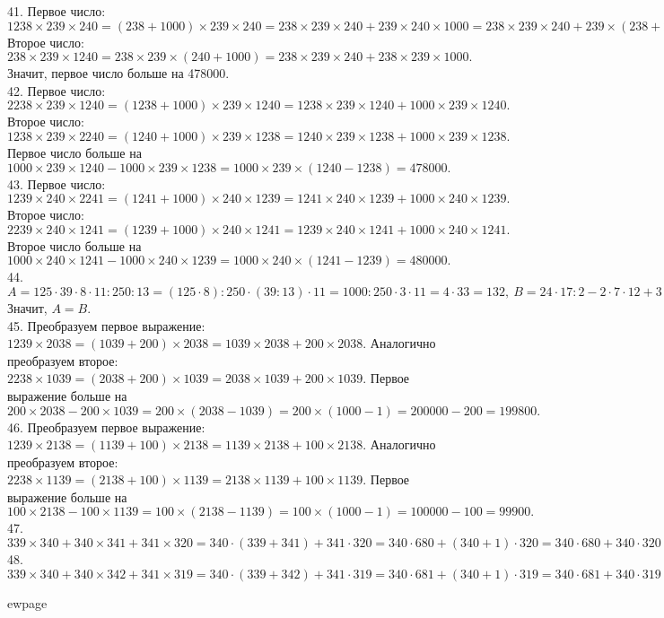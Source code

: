 41. Первое число: $1238\times239\times240=(238+1000)\times239\times240=238\times239\times240+239\times240\times1000=238\times239\times240+239\times(238+2)\times1000=
238\times239\times240+239\times238\times1000+239\times2\times1000=238\times239\times240+239\times238\times1000+478000.$ Второе число: $238\times239\times1240=238\times239\times(240+1000)=238\times239\times240+238\times239\times1000.$ Значит, первое число больше на 478000.\\
42. Первое число: $2238\times239\times1240=(1238+1000)\times239\times1240=
1238\times239\times1240+1000\times239\times1240.$ Второе число:
$1238\times239\times2240=(1240+1000)\times239\times1238=1240\times239\times1238+
1000\times239\times1238.$ Первое число больше на $1000\times239\times1240-1000\times239\times1238=1000\times239\times(1240-1238)=478000.$\\
43. Первое число: $1239\times240\times2241=(1241+1000)\times240\times1239=1241\times240\times1239+1000\times240\times1239.$ Второе число: $2239\times240\times1241=(1239+1000)\times240\times1241=
1239\times240\times1241+1000\times240\times1241.$ Второе число больше на
 $1000\times240\times1241-1000\times240\times1239=1000\times240\times(1241-1239)=480000.$\\
44. $A=125\cdot39\cdot8\cdot11:250:13=(125\cdot8):250\cdot(39:13)\cdot11=1000:250\cdot3\cdot11=4\cdot33=132,\ B=24\cdot17:2-2\cdot7\cdot12+3\cdot45\cdot4-(5+7)\cdot37=17\cdot12-14\cdot12+45\cdot12-37\cdot12=12\cdot(17-14+45-37)=12\cdot11=132.$ Значит, $A=B.$\\
45. Преобразуем первое выражение: $1239\times2038=(1039+200)\times2038=1039\times2038+200\times2038.$ Аналогично преобразуем второе:
$2238\times1039=(2038+200)\times1039=2038\times1039+200\times1039.$ Первое выражение больше на $200\times2038-200\times1039=
200\times(2038-1039)=200\times(1000-1)=200000-200=199800.$\\
46. Преобразуем первое выражение: $1239\times2138=(1139+100)\times2138=1139\times2138+100\times2138.$ Аналогично преобразуем второе:
$2238\times1139=(2138+100)\times1139=2138\times1139+100\times1139.$ Первое выражение больше на $100\times2138-100\times1139=
100\times(2138-1139)=100\times(1000-1)=100000-100=99900.$\\
47. $339 \times 340 + 340 \times 341 + 341 \times 320=
340\cdot(339+341)+341\cdot320=340\cdot680+(340+1)\cdot320=
340\cdot680+340\cdot320+1\cdot320=340\cdot(680+320)+320=
340\cdot1000+320=340320.$\\
48. $339 \times 340 + 340 \times 342 + 341 \times 319=
340\cdot(339+342)+341\cdot319=340\cdot681+(340+1)\cdot319=
340\cdot681+340\cdot319+1\cdot319=340\cdot(681+319)+319=
340\cdot1000+319=340319.$

ewpage
